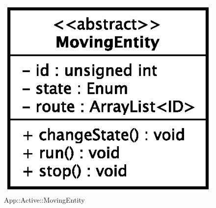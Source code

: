 \begin{figure}[h]
\centering
\includegraphics[scale=0.6,keepaspectratio]{sections/images/solution/moving_entity.eps}
\caption{App::Active::MovingEntity}
\label{fig:sd-app-movingentity}
\end{figure}
